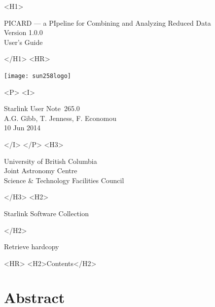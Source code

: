 \documentclass[twoside,11pt]{article}
\newcommand{\stardoccategory}  {Starlink User Note}
\newcommand{\stardocsource}    {sun\stardocnumber}
\newcommand{\stardocnumber}    {265.0}
\newcommand{\stardocauthors}   {A.G. Gibb, T. Jenness, F. Economou}
\newcommand{\stardocdate}      {10 Jun 2014}
\newcommand{\stardoctitle}     {PICARD --- a PIpeline for Combining and Analyzing Reduced Data}
\newcommand{\stardocversion}   {Version 1.0.0}
\newcommand{\stardocmanual}    {User's Guide}
\newcommand{\htmladdnormallink}[2]{#1}
\newcommand{\htmladdimg}[1]{}
\newcommand{\htmlref}[2]{#1}
\newcommand{\htmladdtonavigation}[1]{}
\newcommand{\xlabel}[1]{}
\renewcommand{\_}{\texttt{\symbol{95}}}
\begin{document}
\begin{htmlonly}
   \xlabel{}
   \begin{rawhtml} <H1> \end{rawhtml}
      \stardoctitle\\
      \stardocversion\\
      \stardocmanual
   \begin{rawhtml} </H1> <HR> \end{rawhtml}

\texttt{[image: sun258\_logo]}

   \begin{rawhtml} <P> <I> \end{rawhtml}
   \stardoccategory\ \stardocnumber \\
   \stardocauthors \\
   \stardocdate
   \begin{rawhtml} </I> </P> <H3> \end{rawhtml}
      \htmladdnormallink{University of British Columbia}
                        {http://www.ubc.ca} \\
      \htmladdnormallink{Joint Astronomy Centre}
                        {http://www.jach.hawaii.edu}\\
      \htmladdnormallink{Science \& Technology Facilities Council}
                        {http://www.stfc.ac.uk} \\
   \begin{rawhtml} </H3> <H2> \end{rawhtml}
      \htmladdnormallink{Starlink Software Collection}{http://starlink.jach.hawaii.edu/}
   \begin{rawhtml} </H2> \end{rawhtml}
   \htmladdnormallink{\htmladdimg{source.gif} Retrieve hardcopy}
      {http://starlink.jach.hawaii.edu/cgi-bin/hcserver?\stardocsource}\\

  \label{stardoccontents}
  \begin{rawhtml}
    <HR>
    <H2>Contents</H2>
  \end{rawhtml}
  \htmladdtonavigation{\htmlref{\htmladdimg{contents_motif.gif}}
        {stardoccontents}}

  \section{\xlabel{abstract}Abstract}
\end{htmlonly}
\end{document}
